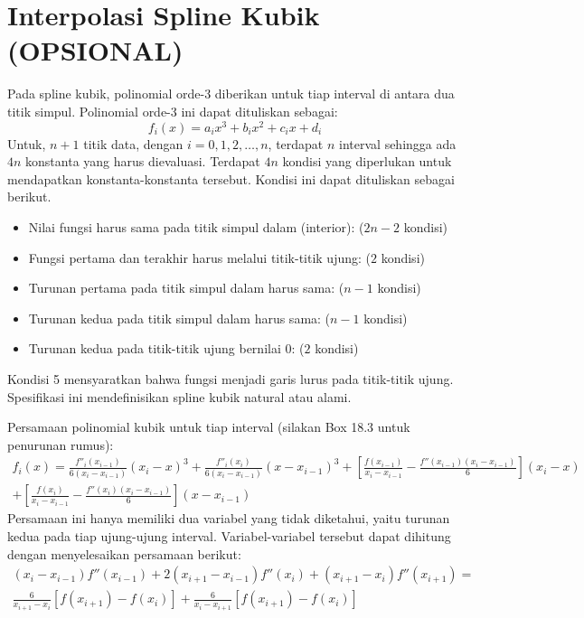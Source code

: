 \section{Interpolasi Spline Kubik (OPSIONAL)}

Pada spline kubik, polinomial orde-3 diberikan untuk tiap interval di antara dua titik simpul.
Polinomial orde-3 ini dapat dituliskan sebagai:
$$
f_i(x) = a_i x^3 + b_i x^2 + c_i x + d_i
$$
Untuk, $n+1$ titik data, dengan $i=0,1,2,\ldots,n$, terdapat $n$ interval sehingga ada $4n$ konstanta yang harus dievaluasi. Terdapat $4n$ kondisi yang diperlukan untuk mendapatkan konstanta-konstanta tersebut. Kondisi ini dapat dituliskan sebagai berikut.
\begin{itemize}
\item Nilai fungsi harus sama pada titik simpul dalam (interior): ($2n-2$ kondisi)
\item Fungsi pertama dan terakhir harus melalui titik-titik ujung: ($2$ kondisi)
\item Turunan pertama pada titik simpul dalam harus sama: ($n-1$ kondisi)
\item Turunan kedua pada titik simpul dalam harus sama: ($n-1$ kondisi)
\item Turunan kedua pada titik-titik ujung bernilai 0: ($2$ kondisi)
\end{itemize}
Kondisi 5 mensyaratkan bahwa fungsi menjadi garis lurus pada titik-titik ujung. Spesifikasi ini mendefinisikan spline kubik natural atau alami.

Persamaan polinomial kubik untuk tiap interval (silakan Box 18.3 untuk penurunan rumus):
\begin{multline}
f_{i}(x) =
\frac{f''_{i}(x_{i-1})}{6(x_{i} - x_{i-1})}(x_{i} - x)^3 +
\frac{f''_{i}(x_{i})}{6(x_{i} - x_{i-1})}(x - x_{i-1})^3
 + \left[
\frac{f(x_{i-1})}{x_{i} - x_{i-1}} - \frac{f''(x_{i-1}) (x_i - x_{i-1})}{6}
\right] (x_i - x) \\
 + \left[
\frac{f(x_{i})}{x_{i} - x_{i-1}} - \frac{f''(x_{i}) (x_i - x_{i-1})}{6}
\right] (x - x_{i-1})
\label{eq:cubicspline}
\end{multline}
Persamaan ini hanya memiliki dua variabel yang tidak diketahui, yaitu turunan kedua
pada tiap ujung-ujung interval. Variabel-variabel tersebut dapat dihitung dengan menyelesaikan
persamaan berikut:
\begin{multline}
(x_i - x_{i-1}) f''(x_{i-1}) + 2(x_{i+1} - x_{i-1}) f''(x_{i}) + (x_{i+1} - x_{i})f''(x_{i+1}) = \\
\frac{6}{x_{i+1} - x_{i}} \left[ f(x_{i+1}) - f(x_i) \right] +
\frac{6}{x_{i} - x_{i+1}} \left[ f(x_{i+1}) - f(x_i) \right]
\label{eq:tridiagsys}
\end{multline}

